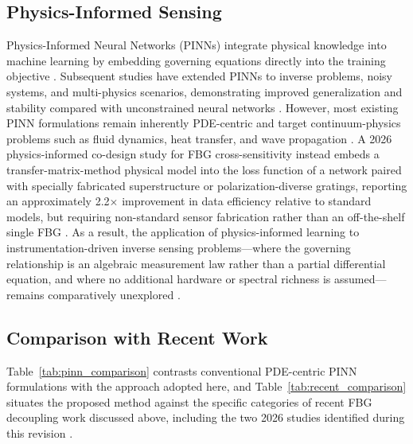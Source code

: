 \documentclass[journal,twoside,web]{ieeecolor}
\begin{document}
\subsection{Physics-Informed Sensing}

Physics-Informed Neural Networks (PINNs) integrate physical knowledge into
machine learning by embedding governing equations directly into the training
objective \cite{b26}. Subsequent studies have extended PINNs to inverse
problems, noisy systems, and multi-physics scenarios, demonstrating improved
generalization and stability compared with unconstrained neural networks
\cite{b28,b29}. However, most existing PINN formulations remain inherently
PDE-centric and target continuum-physics problems such as fluid dynamics,
heat transfer, and wave propagation \cite{b27,b32}. A 2026
physics-informed co-design study for FBG cross-sensitivity instead embeds
a transfer-matrix-method physical model into the loss function of a network
paired with specially fabricated superstructure or polarization-diverse
gratings, reporting an approximately 2.2$\times$ improvement in data
efficiency relative to standard models, but requiring non-standard sensor
fabrication rather than an off-the-shelf single FBG \cite{b39}. As a result,
the application of physics-informed learning to instrumentation-driven
inverse sensing problems---where the governing relationship is an algebraic
measurement law rather than a partial differential equation, and where no
additional hardware or spectral richness is assumed---remains comparatively
unexplored \cite{b33,b34}.

\subsection{Comparison with Recent Work}

Table~\ref{tab:pinn_comparison} contrasts conventional PDE-centric PINN
formulations with the approach adopted here, and
Table~\ref{tab:recent_comparison} situates the proposed method against the
specific categories of recent FBG decoupling work discussed above,
including the two 2026 studies identified during this revision
\cite{b38,b39}.
\end{document}
